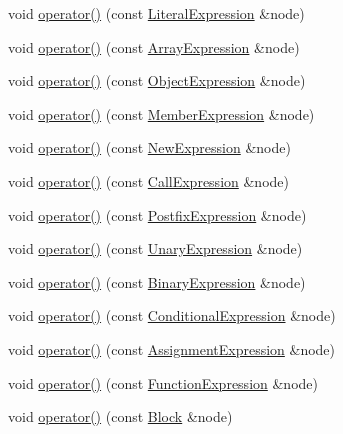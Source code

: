 \begin{DoxyCompactItemize}
\item 
void \hyperlink{struct_delegate_vistor_aad5462e1d6053a95685e9807cc806093}{operator()} (const \hyperlink{struct_literal_expression}{Literal\+Expression} \&node)
\item 
void \hyperlink{struct_delegate_vistor_a1cd7a74dedbded5bba41928b218bbb48}{operator()} (const \hyperlink{struct_array_expression}{Array\+Expression} \&node)
\item 
void \hyperlink{struct_delegate_vistor_aae93fa71457dfb3c00d2249468f525b7}{operator()} (const \hyperlink{struct_object_expression}{Object\+Expression} \&node)
\item 
void \hyperlink{struct_delegate_vistor_a06f7d91b5f3472c286675d6490d00069}{operator()} (const \hyperlink{struct_member_expression}{Member\+Expression} \&node)
\item 
void \hyperlink{struct_delegate_vistor_a9b1c9874077d8bd184c8351a53e49af6}{operator()} (const \hyperlink{struct_new_expression}{New\+Expression} \&node)
\item 
void \hyperlink{struct_delegate_vistor_a1fc41883640efac8064e68c29850969c}{operator()} (const \hyperlink{struct_call_expression}{Call\+Expression} \&node)
\item 
void \hyperlink{struct_delegate_vistor_a8809fdcff726a6063e89bd96467e5f54}{operator()} (const \hyperlink{struct_postfix_expression}{Postfix\+Expression} \&node)
\item 
void \hyperlink{struct_delegate_vistor_a0fcc8b392984adc1a96ecebc7073383b}{operator()} (const \hyperlink{struct_unary_expression}{Unary\+Expression} \&node)
\item 
void \hyperlink{struct_delegate_vistor_a29aa74682b64ffb3fbaa487ac82eb370}{operator()} (const \hyperlink{struct_binary_expression}{Binary\+Expression} \&node)
\item 
void \hyperlink{struct_delegate_vistor_aaa62c8813386fe12d9ee8ce9705e4fa7}{operator()} (const \hyperlink{struct_conditional_expression}{Conditional\+Expression} \&node)
\item 
void \hyperlink{struct_delegate_vistor_a10977cba1c3e36b3096fac46d128b368}{operator()} (const \hyperlink{struct_assignment_expression}{Assignment\+Expression} \&node)
\item 
void \hyperlink{struct_delegate_vistor_a571b86616a181a82291d04fba7712faa}{operator()} (const \hyperlink{struct_function_expression}{Function\+Expression} \&node)
\item 
void \hyperlink{struct_delegate_vistor_a6a7679e5f0793edd951823764d518031}{operator()} (const \hyperlink{struct_block}{Block} \&node)

\end{DoxyCompactItemize}

